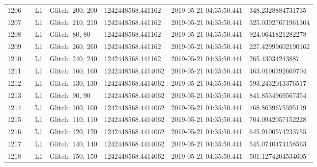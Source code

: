 \begin{longtable}{lllllll}
1206 &                                                    &       L1 &  Glitch: 200, 200 &   1242448568.441162 &  2019-05-21 04:35:50.441 &   348.2328884731735 \\
1207 &                                                    &       L1 &  Glitch: 210, 210 &   1242448568.441162 &  2019-05-21 04:35:50.441 &  325.03927671961304 \\
1208 &                                                    &       L1 &    Glitch: 80, 80 &   1242448568.441162 &  2019-05-21 04:35:50.441 &   924.0641821282278 \\
1209 &                                                    &       L1 &  Glitch: 260, 260 &   1242448568.441162 &  2019-05-21 04:35:50.441 &  227.42999602190162 \\
1210 &                                                    &       L1 &  Glitch: 240, 240 &   1242448568.441162 &  2019-05-21 04:35:50.441 &     265.43034243887 \\
1211 &                                                    &       L1 &  Glitch: 160, 160 &  1242448568.4414062 &  2019-05-21 04:35:50.441 &   463.0190392669704 \\
1212 &                                                    &       L1 &  Glitch: 130, 130 &  1242448568.4414062 &  2019-05-21 04:35:50.441 &   593.2432013376517 \\
1213 &                                                    &       L1 &    Glitch: 90, 90 &  1242448568.4414062 &  2019-05-21 04:35:50.441 &   841.8534969567354 \\
1214 &                                                    &       L1 &  Glitch: 100, 100 &  1242448568.4414062 &  2019-05-21 04:35:50.441 &   768.8639675595119 \\
1215 &                                                    &       L1 &  Glitch: 110, 110 &  1242448568.4414062 &  2019-05-21 04:35:50.441 &   704.0942057152228 \\
1216 &                                                    &       L1 &  Glitch: 120, 120 &  1242448568.4414062 &  2019-05-21 04:35:50.441 &   645.9100574233755 \\
1217 &                                                    &       L1 &  Glitch: 140, 140 &  1242448568.4414062 &  2019-05-21 04:35:50.441 &   545.0740474158563 \\
1218 &                                                    &       L1 &  Glitch: 150, 150 &  1242448568.4414062 &  2019-05-21 04:35:50.441 &   501.1274204534605 \\

\end{longtable}
